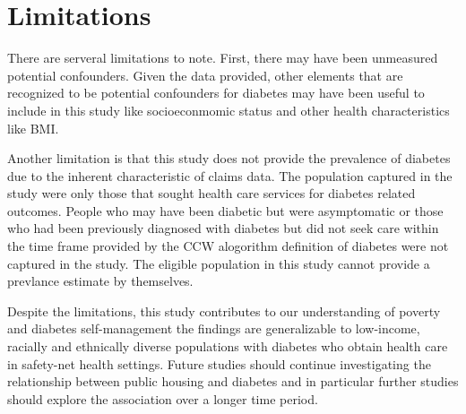 \documentclass [11pt, proquest] {uwthesis}[2015/03/03]
\begin{document}
\section{Limitations}\label{limitations}

There are serveral limitations to note. First, there may have been
unmeasured potential confounders. Given the data provided, other
elements that are recognized to be potential confounders for diabetes
may have been useful to include in this study like socioeconmomic status
and other health characteristics like BMI.

Another limitation is that this study does not provide the prevalence of
diabetes due to the inherent characteristic of claims data. The
population captured in the study were only those that sought health care
services for diabetes related outcomes. People who may have been
diabetic but were asymptomatic or those who had been previously
diagnosed with diabetes but did not seek care within the time frame
provided by the CCW alogorithm definition of diabetes were not captured
in the study. The eligible population in this study cannot provide a
prevlance estimate by themselves.

Despite the limitations, this study contributes to our understanding of
poverty and diabetes self-management the findings are generalizable to
low-income, racially and ethnically diverse populations with diabetes
who obtain health care in safety-net health settings. Future studies
should continue investigating the relationship between public housing
and diabetes and in particular further studies should explore the
association over a longer time period.

\appendix
\end{document}
